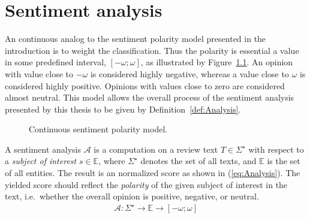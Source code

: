 
\chapter{Sentiment analysis}
\label{chap:sentimentAnalysis}

An continuous analog to the sentiment polarity model presented in the introduction is to weight the classification. Thus the polarity is essential a value in some predefined interval, $[-\omega; \omega]$, as illustrated by Figure~\ref{fig:continuousPolarity}. An opinion with value close to $-\omega$ is considered highly negative, whereas a value close to $\omega$ is considered highly positive. Opinions with values close to zero are considered almost neutral. This model allows the overall process of the sentiment analysis presented by this thesis to be given by Definition~\ref{def:Analysis}.
\begin{figure}[ht]
\begin{center}
\end{center}
\vspace{-1em}
\caption{Continuous sentiment polarity model.}
\label{fig:continuousPolarity}
\end{figure}

\begin{definition}
A sentiment analysis $\mathcal{A}$ is a computation on a review text $T \in \Sigma^\star$ with respect to a \emph{subject of interest} $s \in \mathbb{E}$, where $\Sigma^\star$ denotes the set of all texts, and $\mathbb{E}$ is the set of all entities. The result is an normalized score as shown in (\ref{eq:Analysis}). The yielded score should reflect the \emph{polarity} of the given subject of interest in the text, i.e.\ whether the overall opinion is positive, negative, or neutral.
  \begin{align}
	 \mathcal{A}: \Sigma^\star \to \mathbb{E} \to [-\omega;\omega]
	 \label{eq:Analysis}
  \end{align}
  \label{def:Analysis}
  \done
\end{definition}

